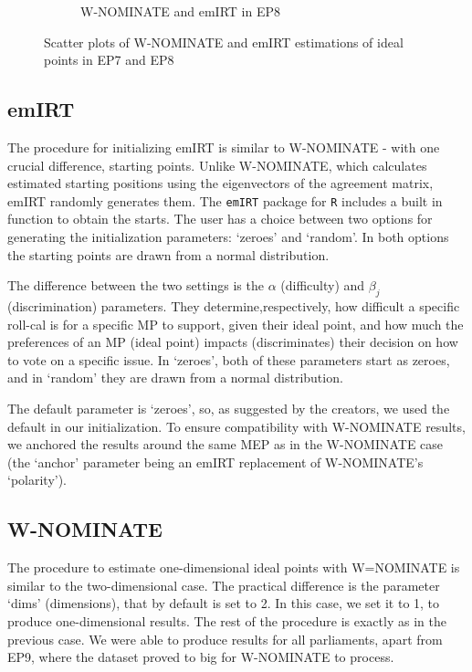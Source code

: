 \documentclass[a4paper,12pt]{report}
\begin{document}
\begin{figure}[H]
\begin{subfigure}[b]{0.48\textwidth}
                    \caption{W-NOMINATE and emIRT in EP8}
                    \label{fig:WNOMINATE_SCATTER_8}
                \end{subfigure}
                \caption{Scatter plots of W-NOMINATE and emIRT estimations of ideal points in EP7 and EP8}
                \label{fig:WNOMINATE_SCATTER_7_8}
            \end{figure}

            \subsection{emIRT}
                The procedure for initializing emIRT is similar to W-NOMINATE - with one crucial difference, starting
                points.
                Unlike W-NOMINATE, which calculates estimated starting positions using the eigenvectors of the agreement
                matrix,
                emIRT randomly generates them. The \texttt{emIRT} package for \texttt{R}
                includes a built in function to obtain
                the starts.
                The user has a choice between two options for generating the initialization parameters: `zeroes'
                and
                `random'.
                In both options the starting points are drawn from a normal distribution.

                The difference between the two settings is the \(\alpha\) (difficulty) and \(\beta_j\)
                (discrimination) parameters.
                They determine,respectively, how difficult a specific roll-cal is for a specific MP to support, given
                their ideal
                point, and how
                much the preferences of an MP (ideal point) impacts (discriminates) their decision on how to vote on a
                specific
                issue.
                In `zeroes', both of these parameters start as zeroes, and in `random' they are drawn from a normal
                distribution.

                The default parameter is `zeroes', so, as suggested by the creators, we used the default in our
                initialization.
                To ensure compatibility with W-NOMINATE results, we anchored the results around the same MEP as in the
                W-NOMINATE case (the `anchor' parameter being an emIRT replacement of W-NOMINATE's `polarity').

            \subsection{W-NOMINATE}
                The procedure to estimate one-dimensional ideal points with W=NOMINATE is similar to the two-dimensional
                case.
                The practical difference is the parameter `dims' (dimensions), that by default is set to 2.
                In this case, we set it to 1, to produce one-dimensional results.
                The rest of the procedure is exactly as in the previous case.
                We were able to produce results for all parliaments, apart from EP9, where the dataset proved to big for
                W-NOMINATE
                to process.
\end{document}
